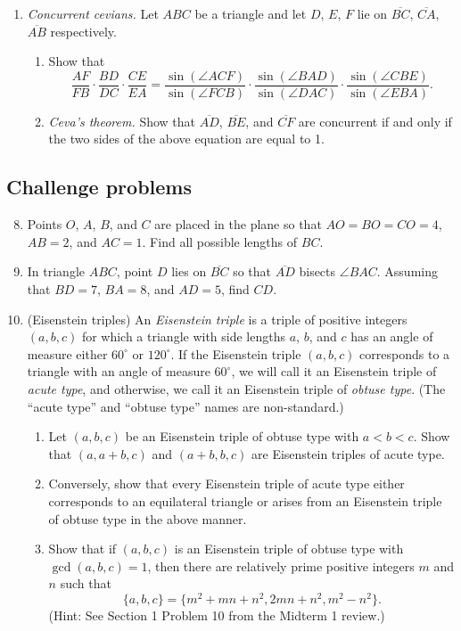 \begin{enumerate}
\begin{enumerate}
\end{enumerate}
\item \emph{Concurrent cevians.} Let $ABC$ be a triangle and let $D$, $E$, $F$ lie on $\overline{BC}$, $\overline{CA}$, $\overline{AB}$ respectively.
\begin{enumerate}
\item Show that
\begin{equation*}
\frac{AF}{FB}\cdot\frac{BD}{DC}\cdot\frac{CE}{EA} = \frac{\sin(\angle ACF)}{\sin(\angle FCB)}\cdot\frac{\sin(\angle BAD)}{\sin(\angle DAC)}\cdot\frac{\sin(\angle CBE)}{\sin(\angle EBA)}.
\end{equation*}
\item \emph{Ceva's theorem.} Show that $\overline{AD}$, $\overline{BE}$, and $\overline{CF}$ are concurrent if and only if the two sides of the above equation are equal to 1.
\end{enumerate}
\end{enumerate}


\subsection{Challenge problems}

\begin{enumerate}\setcounter{enumi}{7}
\item Points $O$, $A$, $B$, and $C$ are placed in the plane so that $AO = BO = CO = 4$, $AB = 2$, and $AC = 1$. Find all possible lengths of $BC$.
\item In triangle $ABC$, point $D$ lies on $\overline{BC}$ so that $\overline{AD}$ bisects $\angle BAC$. Assuming that $BD = 7$, $BA = 8$, and $AD = 5$, find $CD$.
\item (Eisenstein triples) An \emph{Eisenstein triple} is a triple of positive integers $(a,b,c)$ for which a triangle with side lengths $a$, $b$, and $c$ has an angle of measure either $60^{\circ}$ or $120^{\circ}$. If the Eisenstein triple $(a,b,c)$ corresponds to a triangle with an angle of measure $60^{\circ}$, we will call it an Eisenstein triple of \emph{acute type}, and otherwise, we call it an Eisenstein triple of \emph{obtuse type}. (The ``acute type'' and ``obtuse type'' names are non-standard.)
\begin{enumerate}
\item Let $(a,b,c)$ be an Eisenstein triple of obtuse type with $a < b < c$. Show that $(a, a + b, c)$ and $(a + b, b, c)$ are Eisenstein triples of acute type.
\item Conversely, show that every Eisenstein triple of acute type either corresponds to an equilateral triangle or arises from an Eisenstein triple of obtuse type in the above manner.
\item Show that if $(a,b,c)$ is an Eisenstein triple of obtuse type with $\gcd(a,b,c) = 1$, then there are relatively prime positive integers $m$ and $n$ such that
\begin{equation*}
\{a,b,c\} = \{m^2 + mn + n^2, 2mn + n^2, m^2 - n^2\}.
\end{equation*}
(Hint: See Section 1 Problem 10 from the Midterm 1 review.)
\end{enumerate}
\end{enumerate}


